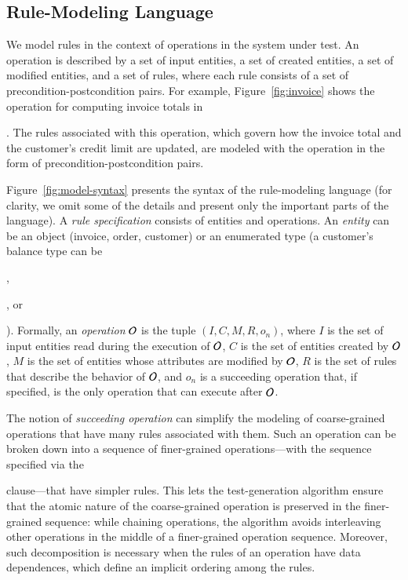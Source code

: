 \subsection{Rule-Modeling Language}

We model rules in the context of operations in the system under test.  An
operation is described by a set of input entities, a set of created entities, a
set of modified entities, and a set of rules, where each rule consists of a set
of precondition-postcondition pairs. For example, Figure~\ref{fig:invoice} shows
the operation for computing invoice totals in \subject{jBilling}. The rules
associated with this operation, which govern how the invoice total and the
customer's credit limit are updated, are modeled with the operation in the form
of precondition-postcondition pairs.

Figure~\ref{fig:model-syntax} presents the syntax of the rule-modeling language
(for clarity, we omit some of the details and present only the important parts
of the language). A \textit{rule specification} consists of entities and
operations. An \textit{entity} can be an object (\eg invoice, order, customer)
or an enumerated type (\eg a customer's balance type can be \subject{None},
\subject{Credit}, or \subject{Prepaid}).
Formally, an \textit{operation} ${\cal O}$ is the tuple $(I, C, M, R, o_n)$,
where $I$ is the set of input entities read during the execution of ${\cal O}$,
$C$ is the set of entities created by ${\cal O}$, $M$ is the set of entities
whose attributes are modified by ${\cal O}$, $R$ is the set of rules that
describe the behavior of ${\cal O}$, and $o_n$ is a succeeding operation that,
if specified, is the only operation that can execute after ${\cal O}$.

The notion of \textit{succeeding operation} can simplify the modeling of
coarse-grained operations that have many rules associated with them. Such an
operation can be broken down into a sequence of finer-grained operations---with
the sequence specified via the \subject{next} clause---that have simpler
rules. This lets the test-generation algorithm ensure that the atomic nature of
the coarse-grained operation is preserved in the finer-grained sequence: while
chaining operations, the algorithm avoids interleaving other operations in the
middle of a finer-grained operation sequence.  Moreover, such decomposition is
necessary when the rules of an operation have data dependences, which define an
implicit ordering among the rules. %

